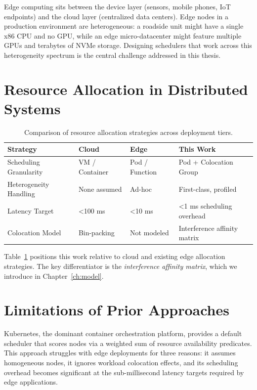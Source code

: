 \documentclass[12pt,letterpaper,twoside]{report}
\begin{document}
Edge computing sits between the device layer (sensors, mobile phones, IoT endpoints) and the cloud layer (centralized data centers). Edge nodes in a production environment are heterogeneous: a roadside unit might have a single x86 CPU and no GPU, while an edge micro-datacenter might feature multiple GPUs and terabytes of NVMe storage. Designing schedulers that work across this heterogeneity spectrum is the central challenge addressed in this thesis.

\section{Resource Allocation in Distributed Systems}

\begin{table}[htbp]
\centering
\caption{Comparison of resource allocation strategies across deployment tiers.}
\label{tab:comparison}
\begin{tabularx}{\textwidth}{l>{\raggedright\arraybackslash}X>{\raggedright\arraybackslash}X>{\raggedright\arraybackslash}X}
\toprule
\textbf{Strategy} & \textbf{Cloud} & \textbf{Edge} & \textbf{This Work} \\
\midrule
Scheduling Granularity & VM / Container & Pod / Function & Pod + Colocation Group \\
Heterogeneity Handling & None assumed & Ad-hoc & First-class, profiled \\
Latency Target & \textless 100 ms & \textless 10 ms & \textless 1 ms scheduling overhead \\
Colocation Model & Bin-packing & Not modeled & Interference affinity matrix \\
\bottomrule
\end{tabularx}
\end{table}

Table~\ref{tab:comparison} positions this work relative to cloud and existing edge allocation strategies. The key differentiator is the \textit{interference affinity matrix}, which we introduce in Chapter~\ref{ch:model}.

\section{Limitations of Prior Approaches}

Kubernetes, the dominant container orchestration platform, provides a default scheduler that scores nodes via a weighted sum of resource availability predicates. This approach struggles with edge deployments for three reasons: it assumes homogeneous nodes, it ignores workload colocation effects, and its scheduling overhead becomes significant at the sub-millisecond latency targets required by edge applications.
\end{document}
